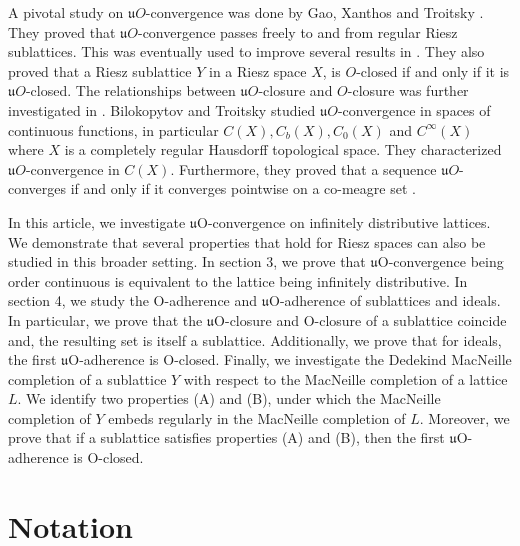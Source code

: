 \documentclass[12pt,a4paper]{amsart}
\numberwithin{equation}{section}
\theoremstyle{definition}
\begin{document}
A pivotal study on $\mathfrak{u}O$-convergence was done by Gao, Xanthos and Troitsky \cite{GTX17}. They proved that $\mathfrak{u}O$-convergence passes freely to and from regular Riesz sublattices. This was eventually used to improve several results in \cite{GAO14,GNX14}. They also proved that a Riesz sublattice $Y$ in a Riesz space $X$, is $O$-closed if and only if it is $\mathfrak{u}O$-closed. The relationships between $\mathfrak{u}O$-closure and $O$-closure was further investigated in \cite{GAOLEU17}. Bilokopytov and Troitsky studied $\mathfrak{u}O$-convergence in spaces of continuous functions, in particular $C(X), C_{b}(X), C_{0}(X)$ and $C^{\infty}(X)$ where $X$ is a completely regular Hausdorff topological space. They characterized $\mathfrak{u}O$-convergence in $C(X)$. Furthermore, they proved that a sequence $\mathfrak{u}O$-converges if and only if it converges pointwise on a co-meagre set \cite{TroitskyBilokopytov}.


In this article, we investigate $\mathfrak{u}$O-convergence on infinitely distributive lattices. We demonstrate that several properties that hold for Riesz spaces can also be studied in this broader setting. In section 3, we prove that $\mathfrak{u}$O-convergence being order continuous is equivalent to the lattice being infinitely distributive. In section 4, we study the O-adherence and $\mathfrak{u}$O-adherence of sublattices and ideals. In particular, we prove that the $\mathfrak{u}$O-closure and O-closure of a sublattice coincide and, the resulting set is itself a sublattice. Additionally, we prove that for ideals, the first $\mathfrak{u}$O-adherence is O-closed. Finally, we investigate the Dedekind MacNeille completion of a sublattice $Y$ with respect to the MacNeille completion of a lattice $L$. We identify two properties (A) and (B), under which the MacNeille completion of $Y$ embeds regularly in the MacNeille completion of $L$. Moreover, we prove that if a sublattice satisfies properties (A) and (B), then the first $\mathfrak{u}$O-adherence is O-closed.

\section{Notation}
\end{document}
